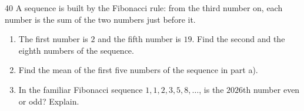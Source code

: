 \begin{probbox}{40}{}
A sequence is built by the Fibonacci rule: from the third number on, each number is the sum of the two numbers just before it.
\begin{enumerate}[label=\alph*),leftmargin=1.6em,itemsep=0pt,topsep=2pt]
  \item The first number is $2$ and the fifth number is $19$. Find the second and the eighth numbers of the sequence.
  \item Find the mean of the first five numbers of the sequence in part a).
  \item In the familiar Fibonacci sequence $1, 1, 2, 3, 5, 8, \ldots$, is the $2026$th number even or odd? Explain.
\end{enumerate}
\end{probbox}
